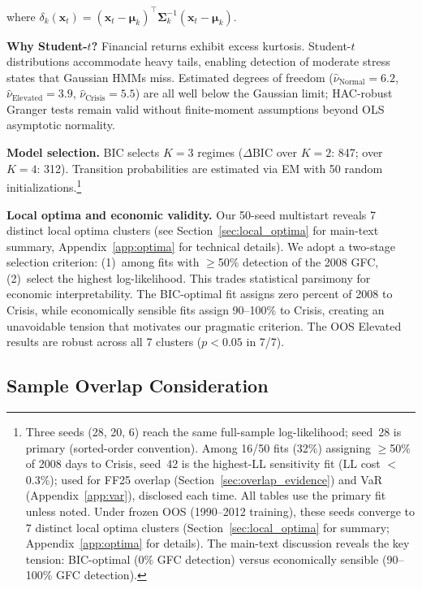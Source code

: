 \documentclass[sigconf,anonymous]{acmart}
\begin{document}
where $\delta_k(\mathbf{x}_t) = (\mathbf{x}_t - \boldsymbol{\mu}_k)^\top\boldsymbol{\Sigma}_k^{-1}(\mathbf{x}_t - \boldsymbol{\mu}_k)$.

\textbf{Why Student-$t$?} Financial returns exhibit excess kurtosis.
Student-$t$ distributions accommodate heavy tails, enabling detection of
moderate stress states that Gaussian HMMs miss.
Estimated degrees of freedom ($\hat{\nu}_{\text{Normal}} = 6.2$,
$\hat{\nu}_{\text{Elevated}} = 3.9$, $\hat{\nu}_{\text{Crisis}} = 5.5$)
are all well below the Gaussian limit; HAC-robust Granger tests remain
valid without finite-moment assumptions beyond OLS asymptotic normality.

\textbf{Model selection.} BIC selects $K=3$ regimes
($\Delta\text{BIC}$ over $K{=}2$: 847; over $K{=}4$: 312). Transition
probabilities are estimated via EM with 50 random
initializations.\footnote{Three seeds (28, 20, 6) reach the same full-sample
log-likelihood; seed~28 is primary (sorted-order convention).
Among 16/50 fits (32\%) assigning $\geq$50\% of 2008 days to Crisis,
seed~42 is the highest-LL sensitivity fit (LL cost $<$0.3\%); used for
FF25 overlap (Section~\ref{sec:overlap_evidence}) and VaR
(Appendix~\ref{app:var}), disclosed each time. All tables use the primary
fit unless noted. Under frozen OOS (1990--2012 training), these seeds
converge to 7 distinct local optima clusters (Section~\ref{sec:local_optima} for summary;
Appendix~\ref{app:optima} for details). The main-text discussion reveals the key tension:
BIC-optimal (0\% GFC detection) versus economically sensible (90--100\% GFC detection).}

\textbf{Local optima and economic validity.}
Our 50-seed multistart reveals 7 distinct local optima clusters (see Section~\ref{sec:local_optima}
for main-text summary, Appendix~\ref{app:optima} for technical details).
We adopt a two-stage selection criterion: (1)~among fits with $\geq$50\% detection
of the 2008 GFC, (2)~select the highest log-likelihood. This trades statistical
parsimony for economic interpretability. The BIC-optimal fit assigns zero percent of 2008
to Crisis, while economically sensible fits assign 90--100\% to Crisis, creating an unavoidable
tension that motivates our pragmatic criterion. The OOS Elevated results are robust
across all 7 clusters ($p < 0.05$ in 7/7).

\subsection{Sample Overlap Consideration}
\end{document}

